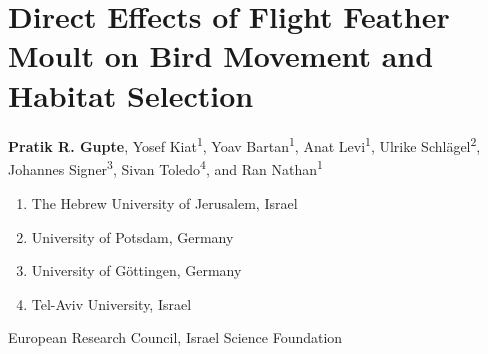 \chapter{Direct Effects of Flight Feather Moult on Bird Movement and Habitat Selection}\label{ch:holeybirds}

{\noindent \textbf{Pratik R. Gupte}, Yosef Kiat\textsuperscript{1}, Yoav Bartan\textsuperscript{1}, Anat Levi\textsuperscript{1}, Ulrike Schl{\"a}gel\textsuperscript{2}, Johannes Signer\textsuperscript{3}, Sivan Toledo\textsuperscript{4}, and Ran Nathan\textsuperscript{1}}

    \medskip

    {\noindent \color{Maroon}\normalsize{}}

    \begin{enumerate}
        \item The Hebrew University of Jerusalem, Israel
        \item University of Potsdam, Germany
        \item University of G{\"o}ttingen, Germany
        \item Tel-Aviv University, Israel
    \end{enumerate}

    \medskip

    {\noindent \color{Maroon}\normalsize{}}

    \medskip
    
    \noindent European Research Council, Israel Science Foundation
